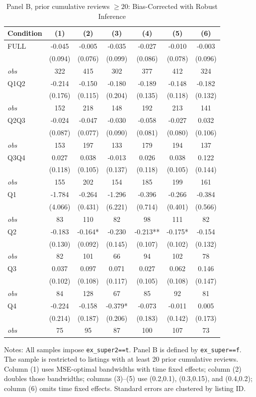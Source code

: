 \begin{table}[!htbp]
\centering
\caption{Panel B, prior cumulative reviews $\geq20$: Bias-Corrected with Robust Inference}
\begin{tabular}{lcccccc}
\toprule
Condition & (1) & (2) & (3) & (4) & (5) & (6) \\
\midrule
FULL & -0.045 & -0.005 & -0.035 & -0.027 & -0.010 & -0.003 \\
 & (0.094) & (0.076) & (0.099) & (0.086) & (0.078) & (0.096) \\
\textit{obs} & 322 & 415 & 302 & 377 & 412 & 324 \\
Q1Q2 & -0.214 & -0.150 & -0.180 & -0.189 & -0.148 & -0.182 \\
 & (0.176) & (0.115) & (0.204) & (0.135) & (0.118) & (0.132) \\
\textit{obs} & 152 & 218 & 148 & 192 & 213 & 141 \\
Q2Q3 & -0.024 & -0.047 & -0.030 & -0.058 & -0.027 & 0.032 \\
 & (0.087) & (0.077) & (0.090) & (0.081) & (0.080) & (0.106) \\
\textit{obs} & 153 & 197 & 133 & 179 & 194 & 137 \\
Q3Q4 & 0.027 & 0.038 & -0.013 & 0.026 & 0.038 & 0.122 \\
 & (0.118) & (0.105) & (0.137) & (0.118) & (0.105) & (0.144) \\
\textit{obs} & 155 & 202 & 154 & 185 & 199 & 161 \\
Q1 & -1.784 & -0.264 & -1.296 & -0.396 & -0.266 & -0.384 \\
 & (4.066) & (0.431) & (6.221) & (0.714) & (0.401) & (0.566) \\
\textit{obs} & 83 & 110 & 82 & 98 & 111 & 82 \\
Q2 & -0.183 & -0.164* & -0.230 & -0.213** & -0.175* & -0.154 \\
 & (0.130) & (0.092) & (0.145) & (0.107) & (0.102) & (0.132) \\
\textit{obs} & 82 & 101 & 66 & 94 & 102 & 78 \\
Q3 & 0.037 & 0.097 & 0.071 & 0.027 & 0.062 & 0.146 \\
 & (0.102) & (0.108) & (0.117) & (0.105) & (0.108) & (0.147) \\
\textit{obs} & 84 & 128 & 67 & 85 & 92 & 81 \\
Q4 & -0.224 & -0.158 & -0.379* & -0.073 & -0.011 & 0.005 \\
 & (0.214) & (0.187) & (0.206) & (0.183) & (0.142) & (0.173) \\
\textit{obs} & 75 & 95 & 87 & 100 & 107 & 73 \\
\bottomrule
\end{tabular}
\begin{minipage}{0.98\textwidth}\footnotesize
Notes: All samples impose \texttt{ex\_super2==t}. Panel B is defined by \texttt{ex\_super==f}. The sample is restricted to listings with at least 20 prior cumulative reviews. Column (1) uses MSE-optimal bandwidths with time fixed effects; column (2) doubles those bandwidths; columns (3)--(5) use (0.2,0.1), (0.3,0.15), and (0.4,0.2); column (6) omits time fixed effects. Standard errors are clustered by listing ID.
\end{minipage}
\end{table}

